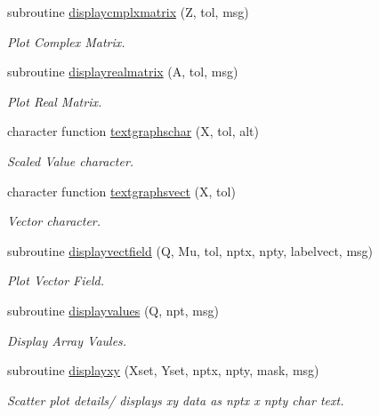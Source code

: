\begin{DoxyCompactItemize}
\item 
subroutine \hyperlink{classtextgraphs_a34e0dbcefa5d7f20393912bea281116e}{displaycmplxmatrix} (Z, tol, msg)
\begin{DoxyCompactList}\small\item\em Plot Complex Matrix. \end{DoxyCompactList}\item 
subroutine \hyperlink{classtextgraphs_aec95adcc32b77f95f0a3625ca97cc374}{displayrealmatrix} (A, tol, msg)
\begin{DoxyCompactList}\small\item\em Plot Real Matrix. \end{DoxyCompactList}\item 
character function \hyperlink{classtextgraphs_accad584018d6cbbc199cc77b34ef2db5}{textgraphschar} (X, tol, alt)
\begin{DoxyCompactList}\small\item\em Scaled Value character. \end{DoxyCompactList}\item 
character function \hyperlink{classtextgraphs_a3ce903686e3a69e50f07b7f1461c53c6}{textgraphsvect} (X, tol)
\begin{DoxyCompactList}\small\item\em Vector character. \end{DoxyCompactList}\item 
subroutine \hyperlink{classtextgraphs_ae7171ed6f50b5b8b77aabd136316a6b8}{displayvectfield} (Q, Mu, tol, nptx, npty, labelvect, msg)
\begin{DoxyCompactList}\small\item\em Plot Vector Field. \end{DoxyCompactList}\item 
subroutine \hyperlink{classtextgraphs_a7f733ce4082530e8bfeb1750d4870575}{displayvalues} (Q, npt, msg)
\begin{DoxyCompactList}\small\item\em Display Array Vaules. \end{DoxyCompactList}\item 
subroutine \hyperlink{classtextgraphs_a857fceafb9446a13966f54fbbce35773}{displayxy} (Xset, Yset, nptx, npty, mask, msg)
\begin{DoxyCompactList}\small\item\em Scatter plot details/ displays xy data as nptx x npty char text. \end{DoxyCompactList}\end{DoxyCompactItemize}



